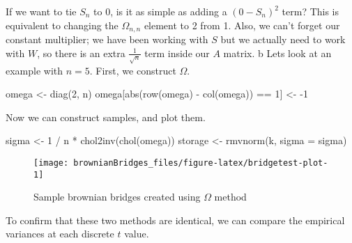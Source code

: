 \documentclass[
]{article}
\newenvironment{Shaded}{\begin{snugshade}}{\end{snugshade}}
\newcommand{\AttributeTok}[1]{\textcolor[rgb]{0.77,0.63,0.00}{#1}}
\newcommand{\DecValTok}[1]{\textcolor[rgb]{0.00,0.00,0.81}{#1}}
\newcommand{\FunctionTok}[1]{\textcolor[rgb]{0.00,0.00,0.00}{#1}}
\newcommand{\NormalTok}[1]{#1}
\newcommand{\OtherTok}[1]{\textcolor[rgb]{0.56,0.35,0.01}{#1}}
\newcommand{\SpecialCharTok}[1]{\textcolor[rgb]{0.00,0.00,0.00}{#1}}
\begin{document}
If we want to tie \(S_n\) to 0, is it as simple as adding a \((0 - S_n)^2\) term? This is equivalent to changing the \(\Omega_{n,n}\) element to 2 from 1. Also, we can't forget our constant multiplier; we have been working with \(S\) but we actually need to work with \(W\), so there is an extra \(\frac{1}{\sqrt{n}}\) term inside our \(A\) matrix.
b
Lets look at an example with \(n = 5\). First, we construct \(\Omega\).

\begin{Shaded}
\begin{Highlighting}[]
\NormalTok{omega }\OtherTok{\textless{}{-}} \FunctionTok{diag}\NormalTok{(}\DecValTok{2}\NormalTok{, n)}
\NormalTok{omega[}\FunctionTok{abs}\NormalTok{(}\FunctionTok{row}\NormalTok{(omega) }\SpecialCharTok{{-}} \FunctionTok{col}\NormalTok{(omega)) }\SpecialCharTok{==} \DecValTok{1}\NormalTok{] }\OtherTok{\textless{}{-}} \SpecialCharTok{{-}}\DecValTok{1}
\end{Highlighting}
\end{Shaded}

Now we can construct samples, and plot them.

\begin{Shaded}
\begin{Highlighting}[]
\NormalTok{sigma }\OtherTok{\textless{}{-}} \DecValTok{1} \SpecialCharTok{/}\NormalTok{ n }\SpecialCharTok{*} \FunctionTok{chol2inv}\NormalTok{(}\FunctionTok{chol}\NormalTok{(omega))}
\NormalTok{storage }\OtherTok{\textless{}{-}} \FunctionTok{rmvnorm}\NormalTok{(k, }\AttributeTok{sigma =}\NormalTok{ sigma)}
\end{Highlighting}
\end{Shaded}

\begin{figure}
\texttt{[image: brownianBridges\_files/figure-latex/bridgetest-plot-1]} \caption{Sample brownian bridges created using $\Omega$ method}\label{fig:bridgetest-plot}
\end{figure}

To confirm that these two methods are identical, we can compare the empirical variances at each discrete \(t\) value.
\end{document}
